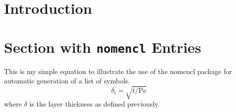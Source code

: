 


\lipsum[5]

\section{Introduction}
\lipsum[6-8]


\section{Section with \texttt{nomencl} Entries}

 This is my simple equation to illustrate the use of the nomencl
 package for automatic generation of a list of symbols.
\begin{equation}
\delta_i = \sqrt{t/\mathrm{Pe}}
\end{equation}
where $\delta$ is the layer
thickness %
%
%
%
as defined previously. \lipsum[13]
\endinput
